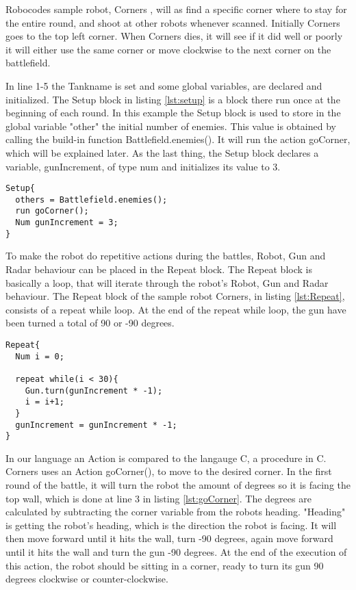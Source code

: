 Robocodes sample robot, Corners \citep{Corners}, will as find a specific corner where to stay for the entire round, and shoot at other robots whenever scanned. Initially Corners goes to the top left corner. When Corners dies, it will see if it did well or poorly it will either use the same corner or move clockwise to the next corner on the battlefield.

In line 1-5 the Tankname is set and some global variables, are declared and initialized. The Setup block in listing \ref{lst:setup} is a block there run once at the beginning of each round. In this example the Setup block is used to store in the global variable "other" the initial number of enemies. This value is obtained by calling the build-in function Battlefield.enemies(). It will run the action goCorner, which will be explained later. As the last thing, the Setup block declares a variable, gunIncrement, of type num and initializes its value to 3.

\begin{lstlisting}[caption={Code listing of the Setup block},  xleftmargin=.2\textwidth, label={lst:setup}]
Setup{
  others = Battlefield.enemies();  
  run goCorner();	 
  Num gunIncrement = 3;
}
\end{lstlisting}

To make the robot do repetitive actions during the battles, Robot, Gun and Radar behaviour can be placed in the Repeat block. The Repeat block is basically a loop, that will iterate through the robot's Robot, Gun and Radar behaviour. The Repeat block of the sample robot Corners, in listing \ref{lst:Repeat}, consists of a repeat while loop. At the end of the repeat while loop, the gun have been turned a total of 90 or -90 degrees. 

\begin{lstlisting}[caption={Code listing of the Repeat block}, xleftmargin=.2\textwidth, label={lst:Repeat}]
Repeat{  
  Num i = 0;
  
  repeat while(i < 30){
    Gun.turn(gunIncrement * -1);
    i = i+1;
  }  
  gunIncrement = gunIncrement * -1;
}
\end{lstlisting}

In our language an Action is compared to the langauge C, a procedure in C. Corners uses an Action goCorner(), to move to the desired corner. In the first round of the battle, it will turn the robot the amount of degrees so it is facing the top wall, which is done at line 3 in listing \ref{lst:goCorner}. The degrees are calculated by subtracting the corner variable from the robots heading. "Heading" is getting the robot's heading, which is the direction the robot is facing. It will then move forward until it hits the wall, turn -90 degrees, again  move forward until it hits the wall and turn the gun -90 degrees. At the end of the execution of this action, the robot should be sitting in a corner, ready to turn its gun 90 degrees clockwise or counter-clockwise.


